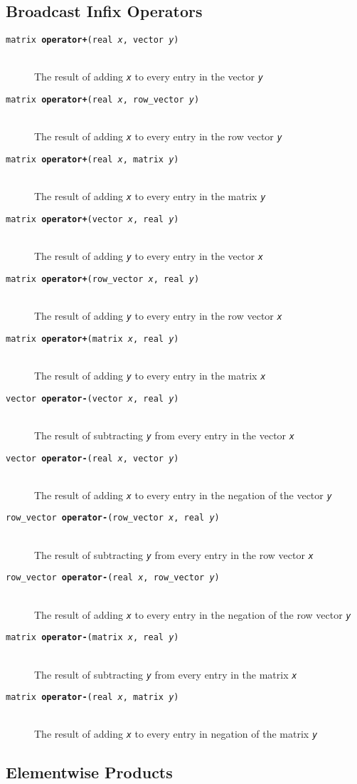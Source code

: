 \documentclass[10pt]{report}
\newcommand{\fitem}[4]{\item[{\tt #1 {\bfseries #2}(#3)}]\mbox{ } \\[4pt] #4}
\newcommand{\farg}[1]{{\tt\slshape #1}}
\begin{document}
\subsection{Broadcast Infix Operators}

\begin{description}
%
\fitem{matrix}{operator+}{real \farg{x}, vector \farg{y}}{The result of
adding \farg{x} to every entry in the vector \farg{y}}
%
\fitem{matrix}{operator+}{real \farg{x}, row\_vector \farg{y}}{The result of
adding \farg{x} to every entry in the row vector \farg{y}}
%
\fitem{matrix}{operator+}{real \farg{x}, matrix \farg{y}}{The result of
adding \farg{x} to every entry in the matrix \farg{y}}
%
\fitem{matrix}{operator+}{vector \farg{x}, real \farg{y}}{The result of
adding \farg{y} to every entry in the vector \farg{x}}
%
\fitem{matrix}{operator+}{row\_vector \farg{x}, real \farg{y}}{The result of
adding \farg{y} to every entry in the row vector \farg{x}}
%
\fitem{matrix}{operator+}{matrix \farg{x}, real \farg{y}}{The result of
adding \farg{y} to every entry in the matrix \farg{x}}
%
\end{description}
\vspace*{-4pt}
\begin{description}
%
\fitem{vector}{operator-}{vector \farg{x}, real \farg{y}}{The result of
subtracting \farg{y} from every entry in the vector \farg{x}}
%
\fitem{vector}{operator-}{real \farg{x}, vector \farg{y}}{The result of
adding \farg{x} to every entry in the negation of the vector \farg{y}}
%
\fitem{row\_vector}{operator-}{row\_vector \farg{x}, real \farg{y}}{The result of
subtracting \farg{y} from every entry in the row vector \farg{x}}
%
\fitem{row\_vector}{operator-}{real \farg{x}, row\_vector \farg{y}}{The result of
adding \farg{x} to every entry in the negation of the row vector \farg{y}}
%
\fitem{matrix}{operator-}{matrix \farg{x}, real \farg{y}}{The result of
subtracting \farg{y} from every entry in the matrix \farg{x}}
%
\fitem{matrix}{operator-}{real \farg{x}, matrix \farg{y}}{The result of
adding \farg{x} to every entry in negation of the matrix \farg{y}}
%
\end{description}

\subsection{Elementwise Products}
\end{document}

